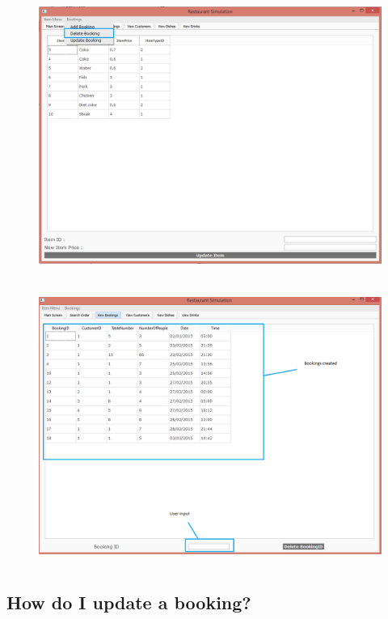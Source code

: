 
\begin{figure}[H]
    \includegraphics[height = 9cm]{./Manual/images/DeleteBooking1} 
    \caption{} \label{fig:deletebooking1}
\end{figure}

\begin{figure}[H]
    \includegraphics[height = 9cm]{./Manual/images/DeleteBooking2} 
    \caption{} \label{fig:deletebooking2}
\end{figure}

\newpage
\subsection{How do I update a booking?}

